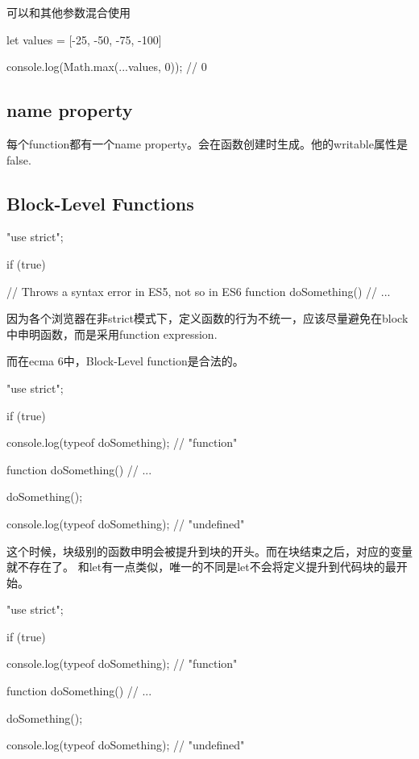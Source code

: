 可以和其他参数混合使用
\begin{JavaScript}
let values = [-25, -50, -75, -100]

console.log(Math.max(...values, 0));        // 0
\end{JavaScript}

\subsection{name property}
每个function都有一个name property。会在函数创建时生成。他的writable属性是false.

\subsection{Block-Level Functions}

\begin{JavaScript}
"use strict";

if (true) {

    // Throws a syntax error in ES5, not so in ES6
    function doSomething() {
        // ...
    }
}
\end{JavaScript}

因为各个浏览器在非strict模式下，定义函数的行为不统一，应该尽量避免在block中申明函数，而是采用function expression.

而在ecma 6中，Block-Level function是合法的。
\begin{JavaScript}[ecma6中]
"use strict";

if (true) {

    console.log(typeof doSomething);        // "function"

    function doSomething() {
        // ...
    }

    doSomething();
}

console.log(typeof doSomething);            // "undefined"
\end{JavaScript}

这个时候，块级别的函数申明会被提升到块的开头。而在块结束之后，对应的变量就不存在了。 和let有一点类似，唯一的不同是let不会将定义提升到代码块的最开始。

\begin{JavaScript}
"use strict";

if (true) {

    console.log(typeof doSomething);        // "function"

    function doSomething() {
        // ...
    }

    doSomething();
}

console.log(typeof doSomething);            // "undefined"
\end{JavaScript}

